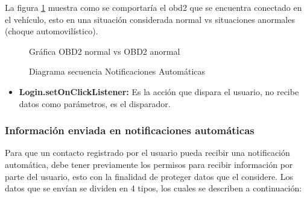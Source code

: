 La figura \ref{fig:NotificaAutoO} muestra como se comportaría el obd2 que se encuentra conectado en el vehículo, esto en una situación considerada normal vs situaciones anormales (choque automovilístico). 
\begin{figure}[htbp!]
	\centering
	\caption{Gráfica OBD2 normal vs OBD2 anormal}
	\label{fig:NotificaAutoO}
\end{figure}


\begin{figure}[htbp!]
	\centering
	\caption{Diagrama secuencia Notificaciones Automáticas}
	\label{fig:NotificaAuto}
\end{figure}
\begin{itemize}
	\item \textbf{Login.setOnClickListener:} Es la acción que dispara el usuario, no recibe datos como parámetros, es el disparador.
\end{itemize}

\subsubsection{Información enviada en notificaciones automáticas}

Para que un contacto registrado por el usuario pueda recibir una notificación automática, debe tener previamente los permisos para recibir información por parte del usuario, esto con la finalidad de proteger datos que el considere. Los datos que se envían se dividen en 4 tipos, los cuales se describen a continuación:

